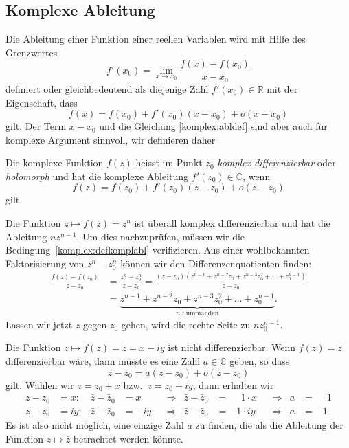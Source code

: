 %
%
\subsection{Komplexe Ableitung}
Die Ableitung einer Funktion einer reellen Variablen wird mit Hilfe des
Grenzwertes
\[
f'(x_0)=\lim_{x\to x_0}\frac{f(x)-f(x_0)}{x-x_0}
\]
definiert oder gleichbedeutend als diejenige Zahl $f'(x_0)\in\mathbb R$
mit der Eigenschaft, dass
\begin{equation}
f(x)=f(x_0)+f'(x_0)(x-x_0) + o(x-x_0)
\label{komplex:abldef}
\end{equation}
gilt.
Der Term $x-x_0$ und die Gleichung \eqref{komplex:abldef} sind aber auch
für komplexe Argument sinnvoll, wir definieren daher

\begin{definition}
\label{buch:funktionentheorie:definition:differenzierbar}
Die komplexe Funktion $f(z)$ heisst im Punkt $z_0$
{\em komplex differenzierbar} oder {\em holomorph}
und hat die komplexe Ableitung $f'(z_0)\in\mathbb C$, wenn
%
%
%
%
\begin{equation}
f(z)=f(z_0) + f'(z_0)(z-z_0) +o(z-z_0)
\label{komplex:defkomplabl}
\end{equation}
gilt.
\end{definition}

\begin{beispiel}
Die Funktion $z\mapsto f(z)=z^n$ ist überall komplex differenzierbar
und hat die Ableitung $nz^{n-1}$.
Um dies nachzuprüfen, müssen wir die Bedingung~\eqref{komplex:defkomplabl}
verifizieren.
Aus einer wohlbekannten Faktorisierung von $z^n - z_0^n$ können wir den
Differenzenquotienten finden:
\begin{align*}
\frac{f(z)-f(z_0)}{z-z_0}
&=
\frac{z^n-z_0^n}{z-z_0}
=
\frac{(z-z_0)(z^{n-1}+z^{n-2}z_0+z^{n-3}z_0^2+\dots+z_0^{n-1})}{z-z_0}
\\
&=
\underbrace{z^{n-1}+z^{n-2}z_0+z^{n-3}z_0^2+\dots+z_0^{n-1}
}_{\displaystyle \text{$n$ Summanden}}.
\end{align*}
Lassen wir jetzt $z$ gegen $z_0$ gehen, wird die rechte Seite
zu $nz_0^{n-1}$.
\end{beispiel}

\begin{beispiel}
Die Funktion $z\mapsto f(z)=\bar z=x-iy$ ist nicht differenzierbar.
Wenn $f(z)=\bar z$ differenzierbar wäre, dann müsste es eine Zahl
$a\in\mathbb C$ geben, so dass
\[
\bar z-\bar z_0=a(z-z_0)+o(z-z_0)
\]
gilt.
Wählen wir $z=z_0+x$ bzw.~$z=z_0+iy$, dann erhalten wir
\[
\begin{aligned}
z-z_0&=x:&
\bar z-\bar z_0&=x
&&\Rightarrow&
\bar z-\bar z_0&=\phantom{-}1\cdot x
&&\Rightarrow&
a&=\phantom{-}1
\\
z-z_0&=iy:&
\bar z-\bar z_0&=-iy
&&\Rightarrow&
\bar z-\bar z_0&=-1\cdot iy
&&\Rightarrow&
a&=-1
\end{aligned}
\]
Es ist also nicht möglich, eine einzige Zahl $a$ zu finden, die als
die Ableitung der Funktion $z\mapsto \bar z$ betrachtet werden könnte.
\end{beispiel}

